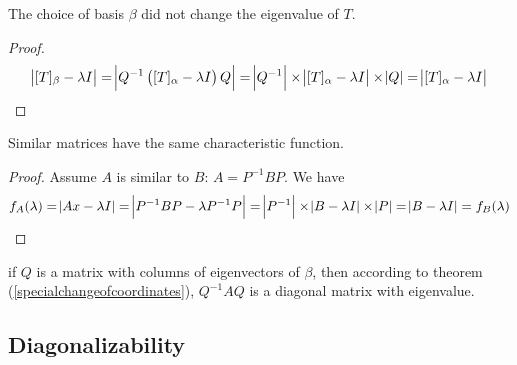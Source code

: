 \begin{theorem}
    The choice of basis $\beta$ did not change the eigenvalue of $T$. 
\end{theorem}
\begin{proof}
    \begin{equation*}
        \abs{[T]_\beta - \lambda I} = \abs{Q^{-1} \left( [T]_\alpha - \lambda I \right) Q} = \abs{Q^{-1}} \times \abs{[T]_\alpha - \lambda I } \times \abs{Q} = \abs{[T]_\alpha - \lambda I } 
    \end{equation*}
\end{proof}

\begin{theorem}
Similar matrices have the same characteristic function.    
\end{theorem}
\begin{proof}
    Assume $A$ is similar to $B$: $A = P^{-1} B P$. We have
    \begin{equation*}
    f_A(\lambda) = \abs{Ax - \lambda I} = \abs{P^{-1} B P - \lambda P^{-1} P} = \abs{P^{-1}} \times \abs{B - \lambda I } \times \abs{P} = \abs{B - \lambda I } = f_B(\lambda)
    \end{equation*}
\end{proof}




\begin{theorem}
    if $Q$ is a matrix with columns of eigenvectors of $\beta$, then according to theorem (\ref{specialchangeofcoordinates}), $Q^{-1} A Q$ is a diagonal matrix with eigenvalue.
\end{theorem}



\subsection{Diagonalizability}


